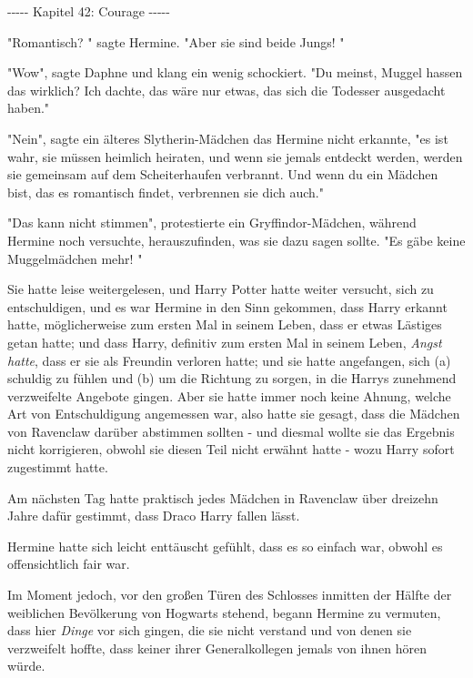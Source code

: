 

\hypertarget{courage}{%

-\/-\/-\/-\/- Kapitel 42: Courage -\/-\/-\/-\/-

"Romantisch? " sagte Hermine. "Aber sie sind beide Jungs! "

"Wow", sagte Daphne und klang ein wenig schockiert. "Du meinst, Muggel hassen das wirklich? Ich dachte, das wäre nur etwas, das sich die Todesser ausgedacht haben."

"Nein", sagte ein älteres Slytherin-Mädchen das Hermine nicht erkannte, "es ist wahr, sie müssen heimlich heiraten, und wenn sie jemals entdeckt werden, werden sie gemeinsam auf dem Scheiterhaufen verbrannt. Und wenn du ein Mädchen bist, das es romantisch findet, verbrennen sie dich auch."

"Das kann nicht stimmen", protestierte ein Gryffindor-Mädchen, während Hermine noch versuchte, herauszufinden, was sie dazu sagen sollte. "Es gäbe keine Muggelmädchen mehr! "

Sie hatte leise weitergelesen, und Harry Potter hatte weiter versucht, sich zu entschuldigen, und es war Hermine in den Sinn gekommen, dass Harry erkannt hatte, möglicherweise zum ersten Mal in seinem Leben, dass er etwas Lästiges getan hatte; und dass Harry, definitiv zum ersten Mal in seinem Leben, \emph{Angst hatte}, dass er sie als Freundin verloren hatte; und sie hatte angefangen, sich (a) schuldig zu fühlen und (b) um die Richtung zu sorgen, in die Harrys zunehmend verzweifelte Angebote gingen. Aber sie hatte immer noch keine Ahnung, welche Art von Entschuldigung angemessen war, also hatte sie gesagt, dass die Mädchen von Ravenclaw darüber abstimmen sollten - und diesmal wollte sie das Ergebnis nicht korrigieren, obwohl sie diesen Teil nicht erwähnt hatte - wozu Harry sofort zugestimmt hatte.

Am nächsten Tag hatte praktisch jedes Mädchen in Ravenclaw über dreizehn Jahre dafür gestimmt, dass Draco Harry fallen lässt.

Hermine hatte sich leicht enttäuscht gefühlt, dass es so einfach war, obwohl es offensichtlich fair war.

Im Moment jedoch, vor den großen Türen des Schlosses inmitten der Hälfte der weiblichen Bevölkerung von Hogwarts stehend, begann Hermine zu vermuten, dass hier \emph{Dinge} vor sich gingen, die sie nicht verstand und von denen sie verzweifelt hoffte, dass keiner ihrer Generalkollegen jemals von ihnen hören würde.

}
